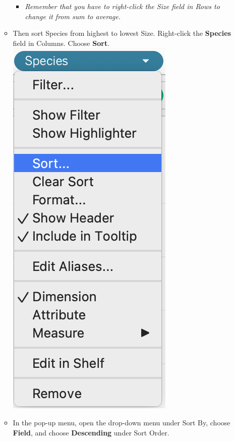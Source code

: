 \documentclass[
]{book}
\providecommand{\tightlist}{%
  \setlength{\itemsep}{0pt}\setlength{\parskip}{0pt}}
\begin{document}
\begin{enumerate}
\begin{itemize}
    \begin{itemize}
    \tightlist
    \item
      \emph{Remember that you have to right-click the Size field in Rows to change it from sum to average. }
    \end{itemize}
  \item
    Then sort Species from highest to lowest Size. Right-click the \textbf{Species} field in Columns. Choose \textbf{Sort}.
    \includegraphics{images/M3S3-bars3-species-sort.png}
  \item
    In the pop-up menu, open the drop-down menu under Sort By, choose \textbf{Field}, and choose \textbf{Descending} under Sort Order.

\end{itemize}
\end{enumerate}
\end{document}
